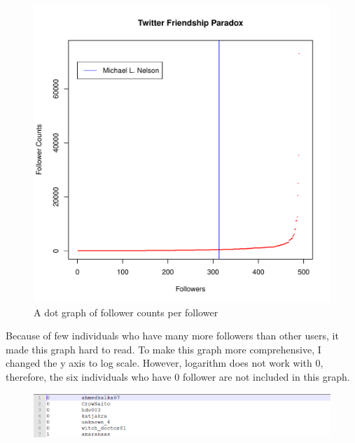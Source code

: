 \documentclass[12pt]{article}
\begin{document}
\newpage

\begin{figure}[h]
\centering
\includegraphics[width=5in]{TwitterFollowers.pdf}
\caption{A dot graph of follower counts per follower}
\end{figure}



Because of few individuals who have many more followers than other users, it made this graph hard to read. To make this graph more comprehensive, I changed the y axis to log scale. However, logarithm does not work with 0, therefore, the six individuals who have 0 follower are not included in this graph.

\begin{figure}[h]
\centering
\includegraphics[width=6.5in]{twitterexcluded.png}
\end{figure}
\newpage
\end{document}
